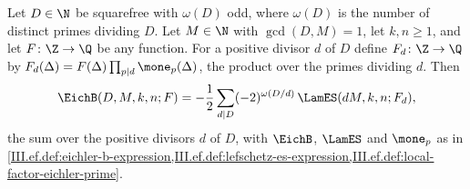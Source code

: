 Let $D\in\N$ be squarefree with $\omega(D)$ odd, where $\omega(D)$ is the number of distinct primes dividing $D$. Let $M\in\N$ with $\gcd(D,M)=1$,
let $k,n\ge1$, and let $F\colon\Z\to\Q$ be any function. For a positive divisor $d$ of $D$ define $F_d\colon\Z\to\Q$ by
$F_d(\Delta)=F(\Delta)\prod_{p\mid d}\mone_p(\Delta)$, the product over the primes dividing $d$. Then
\[
  \EichB(D,M,k,n;F)=-\frac12\sum_{d\mid D}(-2)^{\omega(D/d)}\,\LamES(dM,k,n;F_d),
\]
the sum over the positive divisors $d$ of $D$, with $\EichB$, $\LamES$ and $\mone_p$ as in
\cref{III.ef.def:eichler-b-expression,III.ef.def:lefschetz-es-expression,III.ef.def:local-factor-eichler-prime}.
